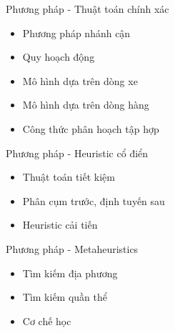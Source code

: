 \begin{frame}{Phương pháp - Thuật toán chính xác}
  \begin{itemize}
    \item Phương pháp nhánh cận
    \item Quy hoạch động
    \item Mô hình dựa trên dòng xe 
    \item Mô hình dựa trên dòng hàng
    \item Công thức phân hoạch tập hợp
  \end{itemize}
\end{frame}

\begin{frame}{Phương pháp - Heuristic cổ điển}
  \begin{itemize}
    \item Thuật toán tiết kiệm
    \item Phân cụm trước, định tuyến sau 
    \item Heuristic cải tiến
  \end{itemize}
\end{frame}

\begin{frame}{Phương pháp - Metaheuristics}
  \begin{itemize}
    \item Tìm kiếm địa phương
    \item Tìm kiếm quần thể 
    \item Cơ chế học
  \end{itemize}
\end{frame}

